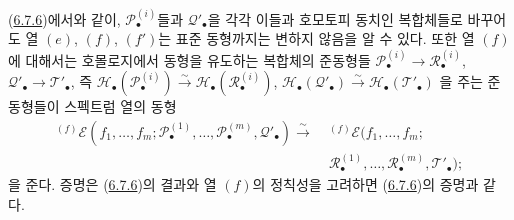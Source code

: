 \begin{remark}[6.9.5]
\label{III.6.9.5-fr}
(\hyperref[III.6.7.6-fr]{6.7.6})에서와 같이,
$\mathscr P_\bullet^{(i)}$들과 $\mathscr Q'_\bullet$을 각각 이들과
호모토피 동치인 복합체들로 바꾸어도 열 $(e)$, $(f)$, $(f')$는
표준 동형까지는 변하지 않음을 알 수 있다. 또한 열 $(f)$에 대해서는
호몰로지에서 동형을 유도하는 복합체의 준동형들
$\mathscr P_\bullet^{(i)}\to\mathscr R_\bullet^{(i)}$,
$\mathscr Q'_\bullet\to\mathscr T'_\bullet$, 즉
$\mathscr H_\bullet(\mathscr P_\bullet^{(i)})\xrightarrow{\sim}
\mathscr H_\bullet(\mathscr R_\bullet^{(i)})$,
$\mathscr H_\bullet(\mathscr Q'_\bullet)\xrightarrow{\sim}
\mathscr H_\bullet(\mathscr T'_\bullet)$
을 주는 준동형들이 스펙트럼 열의 동형
\[
\begin{split}
  {}^{(f)}\mathscr E
  (f_1,\ldots,f_m;
   \mathscr P_\bullet^{(1)},\ldots,\mathscr P_\bullet^{(m)},
   \mathscr Q'_\bullet)
  \xrightarrow{\sim}\;&
  {}^{(f)}\mathscr E
  (f_1,\ldots,f_m;\\
  &\mathscr R_\bullet^{(1)},\ldots,\mathscr R_\bullet^{(m)},
   \mathscr T'_\bullet);
\end{split}
\]
을 준다. 증명은 (\hyperref[III.6.7.6-fr]{6.7.6})의 결과와 열 $(f)$의
정칙성을 고려하면 (\hyperref[III.6.7.6-fr]{6.7.6})의 증명과 같다.
\end{remark}


